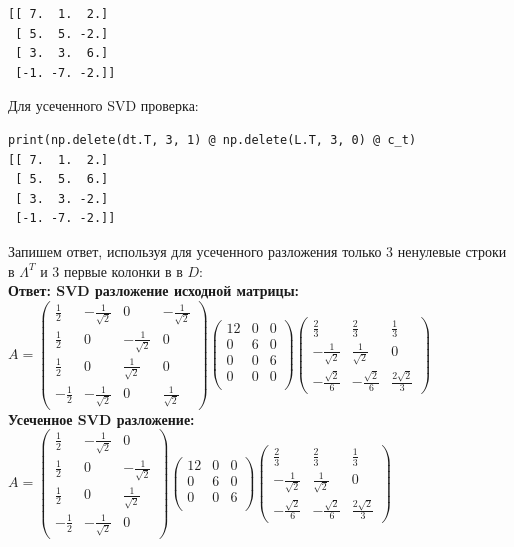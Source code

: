 \documentclass[a4paper,12pt]{article}
\begin{document}
\begin{enumerate}
\begin{verbatim}
[[ 7.  1.  2.]
 [ 5.  5. -2.]
 [ 3.  3.  6.]
 [-1. -7. -2.]]
\end{verbatim}

Для усеченного SVD проверка:
\begin{verbatim}
print(np.delete(dt.T, 3, 1) @ np.delete(L.T, 3, 0) @ c_t)
[[ 7.  1.  2.]
 [ 5.  5.  6.]
 [ 3.  3. -2.]
 [-1. -7. -2.]]
 \end{verbatim}


Запишем ответ, используя для усеченного разложения только 3 ненулевые строки в  $\Lambda^T$ и 3 первые колонки в  в $D$:\\
\textbf{Ответ: SVD разложение исходной матрицы:\\ $A = \begin{pmatrix}
\frac{1}{2}&-\frac{1}{\sqrt{2}}&0&-\frac{1}{\sqrt{2}}\\
\frac{1}{2}&0&-\frac{1}{\sqrt{2}}&0\\
\frac{1}{2}&0&\frac{1}{\sqrt{2}}&0\\
-\frac{1}{2}&-\frac{1}{\sqrt{2}}&0&\frac{1}{\sqrt{2}}
\end{pmatrix} \begin{pmatrix}
12&0&0\\
0&6&0\\
0&0&6\\
0&0&0\\
\end{pmatrix} \begin{pmatrix}
\frac{2}{3}&\frac{2}{3}&\frac{1}{3}\\
-\frac{1}{\sqrt{2}}&\frac{1}{\sqrt{2}}&0\\
-\frac{\sqrt{2}}{6}&-\frac{\sqrt{2}}{6}&\frac{2\sqrt{2}}{3}
\end{pmatrix}$ \\
Усеченное SVD разложение:\\
$A = \begin{pmatrix}
\frac{1}{2}&-\frac{1}{\sqrt{2}}&0\\
\frac{1}{2}&0&-\frac{1}{\sqrt{2}}\\
\frac{1}{2}&0&\frac{1}{\sqrt{2}}\\
-\frac{1}{2}&-\frac{1}{\sqrt{2}}&0
\end{pmatrix} \begin{pmatrix}
12&0&0\\
0&6&0\\
0&0&6\\
\end{pmatrix} \begin{pmatrix}
\frac{2}{3}&\frac{2}{3}&\frac{1}{3}\\
-\frac{1}{\sqrt{2}}&\frac{1}{\sqrt{2}}&0\\
-\frac{\sqrt{2}}{6}&-\frac{\sqrt{2}}{6}&\frac{2\sqrt{2}}{3}
\end{pmatrix}$ }


\end{enumerate}
\end{document}
